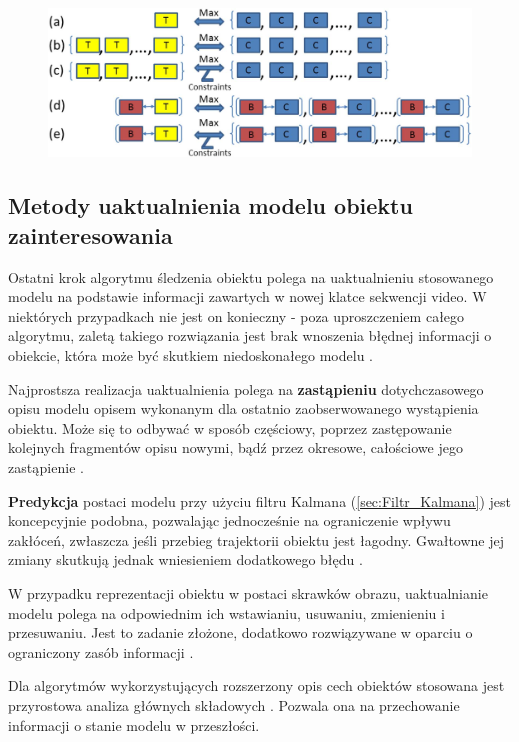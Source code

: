 \begin{figure}[!htb]
	\begin{center}
		\includegraphics[width=12cm]{images/target_tracking_methods.png}
	\end{center}	
\label{fig:Metody_sledzenia_obiektow_na_obrazach}
\end{figure}

\subsection{Metody uaktualnienia modelu obiektu zainteresowania}
\label{subsec:Metody_uaktualnienia_modelu_obiektu_zainteresowania}

Ostatni krok algorytmu śledzenia obiektu polega na uaktualnieniu stosowanego modelu na podstawie informacji zawartych w nowej klatce sekwencji video. W niektórych przypadkach nie jest on konieczny - poza uproszczeniem całego algorytmu, zaletą takiego rozwiązania jest brak wnoszenia błędnej informacji o obiekcie, która może być skutkiem niedoskonałego modelu \cite{Smeulders2010}.

Najprostsza realizacja uaktualnienia polega na \textbf{zastąpieniu} dotychczasowego opisu modelu opisem wykonanym dla ostatnio zaobserwowanego wystąpienia obiektu. Może się to odbywać w sposób częściowy, poprzez zastępowanie kolejnych fragmentów opisu nowymi, bądź przez okresowe, całościowe jego zastąpienie \cite{Smeulders2010}. 

\textbf{Predykcja} postaci modelu przy użyciu filtru Kalmana (\ref{sec:Filtr_Kalmana}) jest koncepcyjnie podobna, pozwalając jednocześnie na ograniczenie wpływu zakłóceń, zwłaszcza jeśli przebieg trajektorii obiektu jest łagodny. Gwałtowne jej zmiany skutkują jednak wniesieniem dodatkowego błędu \cite{Smeulders2010}. 

W przypadku reprezentacji obiektu w postaci skrawków obrazu, uaktualnianie modelu polega na odpowiednim ich wstawianiu, usuwaniu, zmienieniu i przesuwaniu. Jest to zadanie złożone, dodatkowo rozwiązywane w oparciu o ograniczony zasób informacji \cite{Smeulders2010}.

Dla algorytmów wykorzystujących rozszerzony opis cech obiektów stosowana jest przyrostowa analiza głównych składowych \cite{Smeulders2010}. Pozwala ona na przechowanie informacji o stanie modelu w przeszłości.